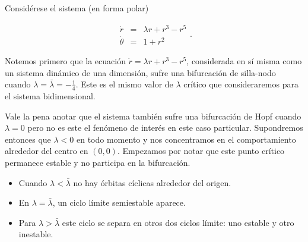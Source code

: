 \begin{example} \label{ex:bifurcacionsillanododeciclos}
Considérese el sistema (en forma polar)

\begin{equation}
	\begin{array}{lll}
		\dot{r} & = & \lambda r + r^3 - r^5 \\
		\dot{\theta} & = & 1 + r^2
	\end{array}.
\end{equation}

Notemos primero que la ecuación $\dot{r} = \lambda r + r^3 - r^5$, considerada en sí misma como un sistema dinámico de una dimensión, sufre una bifurcación de silla-nodo cuando $\lambda = \bar{\lambda} = - \frac{1}{4}$. Este es el mismo valor de $\lambda$ crítico que consideraremos para el sistema bidimensional.

Vale la pena anotar que el sistema también sufre una bifurcación de Hopf cuando $\lambda = 0$ pero no es este el fenómeno de interés en este caso particular. Supondremos entonces que $\lambda < 0$ en todo momento y nos concentramos en el comportamiento alrededor del centro en $(0,0)$. Empezamos por notar que este punto crítico permanece estable y no participa en la bifurcación. 

\begin{itemize}
	\item Cuando $\lambda < \bar{\lambda}$ no hay órbitas cíclicas alrededor del origen.
	\item En $\lambda = \bar{\lambda}$, un ciclo límite semiestable aparece.
	\item Para $\lambda > \bar{\lambda}$ este ciclo se separa en otros dos ciclos límite: uno estable y otro inestable.
\end{itemize}


\end{example}
